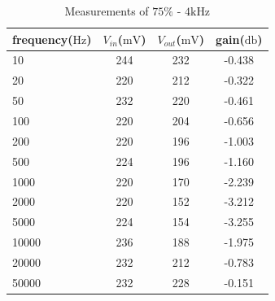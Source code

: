 \begin{table}[!htbp]
	\centering
	\caption{Measurements of $75\%$ - $4\si{\kilo\hertz}$}
	\label{tab:data22}
	\begin{tabular}{lccc}
		\toprule
		frequency($\si{\hertz}$) & $V_{in}$($\si{\milli\volt}$) & $V_{out}$($\si{\milli\volt}$) & gain($\si{\decibel}$) \\
		\midrule
		10&	244&	232&	-0.438\\
		20&	220&	212&	-0.322\\
		50&	232&	220&	-0.461\\
		100&	220&	204&	-0.656\\
		200&	220&	196&	-1.003\\
		500&	224&	196&	-1.160\\
		1000&	220&	170&	-2.239\\
		2000&	220&	152&	-3.212\\
		5000&	224&	154&	-3.255\\
		10000&	236&	188&	-1.975\\
		20000&	232&	212&	-0.783\\
		50000&	232&	228&	-0.151\\
		\bottomrule
	\end{tabular}
\end{table}


